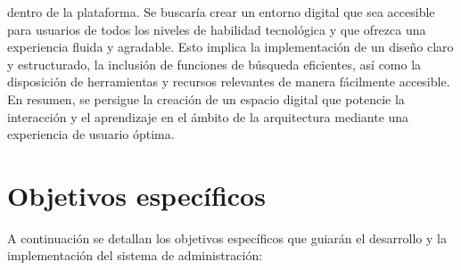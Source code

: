 \documentclass[a4paper, 12pt]{book}
\begin{document}
\begin{itemize}
  dentro de la plataforma. Se buscaría crear un entorno digital que sea accesible para usuarios de todos los niveles de habilidad tecnológica y que ofrezca 
  una experiencia fluida y agradable. Esto implica la implementación de un diseño claro y estructurado, la inclusión de funciones de búsqueda eficientes, 
  así como la disposición de herramientas y recursos relevantes de manera fácilmente accesible. \\ En resumen, se persigue la creación de un espacio digital 
  que potencie la interacción y el aprendizaje en el ámbito de la arquitectura mediante una experiencia de usuario óptima.
\end{itemize}

\section{Objetivos específicos}
\label{sec:objetivos-especificos}

A continuación se detallan los objetivos específicos que guiarán el desarrollo y la implementación del sistema de administración:
\end{document}
